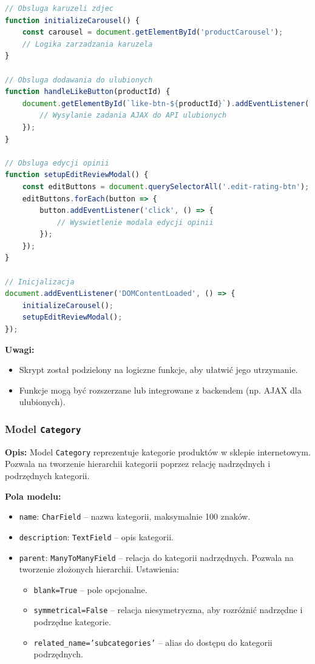 \documentclass[12pt,a4paper,oneside]{article}
\theoremstyle{definition}
\numberwithin{equation}{section}
\begin{document}
\begin{lstlisting}[language=JavaScript, caption=Skrypt product\_detail.js]
// Obsluga karuzeli zdjec
function initializeCarousel() {
    const carousel = document.getElementById('productCarousel');
    // Logika zarzadzania karuzela
}

// Obsluga dodawania do ulubionych
function handleLikeButton(productId) {
    document.getElementById(`like-btn-${productId}`).addEventListener('click', () => {
        // Wysylanie zadania AJAX do API ulubionych
    });
}

// Obsluga edycji opinii
function setupEditReviewModal() {
    const editButtons = document.querySelectorAll('.edit-rating-btn');
    editButtons.forEach(button => {
        button.addEventListener('click', () => {
            // Wyswietlenie modala edycji opinii
        });
    });
}

// Inicjalizacja
document.addEventListener('DOMContentLoaded', () => {
    initializeCarousel();
    setupEditReviewModal();
});
\end{lstlisting}

\textbf{Uwagi:}
\begin{itemize}
    \item Skrypt został podzielony na logiczne funkcje, aby ułatwić jego utrzymanie.
    \item Funkcje mogą być rozszerzane lub integrowane z backendem (np. AJAX dla ulubionych).
\end{itemize}


% 
% 
\subsubsection{Model \texttt{Category}}

\textbf{Opis:}  
Model \texttt{Category} reprezentuje kategorie produktów w sklepie internetowym. Pozwala na tworzenie hierarchii kategorii poprzez relację nadrzędnych i podrzędnych kategorii.

\textbf{Pola modelu:}
\begin{itemize}
    \item \texttt{name}: \texttt{CharField} – nazwa kategorii, maksymalnie 100 znaków.
    \item \texttt{description}: \texttt{TextField} – opis kategorii.
    \item \texttt{parent}: \texttt{ManyToManyField} – relacja do kategorii nadrzędnych. Pozwala na tworzenie złożonych hierarchii. Ustawienia:
    \begin{itemize}
        \item \texttt{blank=True} – pole opcjonalne.
        \item \texttt{symmetrical=False} – relacja niesymetryczna, aby rozróżnić nadrzędne i podrzędne kategorie.
        \item \texttt{related\_name='subcategories'} – alias do dostępu do kategorii podrzędnych.
    \end{itemize}
\end{itemize}
\end{document}
